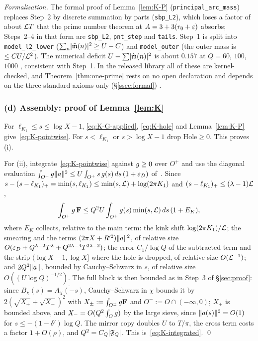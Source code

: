 \emph{Formalisation.} The formal proof of Lemma~\ref{lem:K-P} (\texttt{principal\_arc\_mass}) replaces Step~2 by discrete
summation by parts (\texttt{sbp\_L2}), which loses a factor of about $\mathcal L T$ that the prime number theorem at $A=3+3(r_0+\varepsilon)$ absorbs;
Steps~2--4 in that form are \texttt{sbp\_L2}, \texttt{pnt\_step} and \texttt{tails}. Step~1 is split into \texttt{model\_l2\_lower}
($\sum_n\lvert \tilde{\mathfrak m}(n)\rvert^2\ge U-C$) and \texttt{model\_outer} (the outer mass is $\le CU/\mathcal L^2$). The numerical deficit
$U-\sum\lvert \tilde{\mathfrak m}(n)\rvert^2$ is about $0.157$ at $Q=60$, $100$, $1000$ \tagN, consistent with Step~1. In the released library all of these
are kernel-checked, and Theorem~\ref{thm:one-prime} rests on no open declaration and depends on the three standard axioms only
(\S\ref{ssec:formal}) \tagL.

\subsubsection*{(d) Assembly: proof of Lemma~\ref{lem:K}}
For $\ell_{K_1}\le s\le\log X-1$, \eqref{eq:K-G-applied}, \eqref{eq:K-hole} and Lemma~\ref{lem:K-P} give~\eqref{eq:K-pointwise}. For $s<\ell_{K_1}$ or
$s>\log X-1$ drop $\mathrm{Hole}\ge0$. This proves (i).

For (ii), integrate~\eqref{eq:K-pointwise} against $g\ge0$ over $O^+$ and use the diagonal evaluation
$\int_{O^+}g\lVert a\rVert^2\le U\int_{O^+}s\,g(s)\,ds\,(1+\varepsilon_D)$ of~\cite{DSouza}. Since $s-(s-\ell_{K_1})_+=\min(s,\ell_{K_1})\le\min(s,\mathcal L)+\log(2\pi K_1)$
and $(s-\ell_{K_1})_+\le(\lambda-1)\mathcal L$,
\[
\int_{O^+}g\,\mathbf F\le Q^2U\int_{O^+}g(s)\min(s,\mathcal L)\,ds\,(1+E_K),
\]
where $E_K$ collects, relative to the main term: the kink shift $\log(2\pi K_1)/\mathcal L$; the smearing and the terms $(2\pi X+R'^2)\lVert a\rVert^2$,
of relative size $O(\varepsilon_D+Q^{\lambda-2}T^\lambda+Q^{2\lambda-4}T^{2\lambda-2})$; the error $C_1/\log Q$ of the subtracted term and the strip
$(\log X-1,\log X]$ where the hole is dropped, of relative size $O(\mathcal L^{-1})$; and $2Q^2\lVert a\rVert$, bounded by Cauchy--Schwarz in $s$, of relative
size $O((U\log Q)^{-1/2})$. The full block is then bounded as in Step~3 of \S\ref{sec:proof}: since $B_\chi(s)=\overline{A_\chi(-s)}$, Cauchy--Schwarz in $\chi$ bounds it by
$2(\sqrt{X_+}+\sqrt{X_-})^2$ with $X_\pm:=\int_{O^\pm}g\mathbf F$ and $O^-:=O\cap(-\infty,0)$; $X_+$ is bounded above, and $X_-=O(Q^2\int_Og)$ by the large sieve,
since $\lVert a(s)\rVert^2=O(1)$ for $s\le-(1-\delta')\log Q$. The mirror copy doubles $U$ to $T/\pi$, the cross term costs a factor $1+O(\rho)$, and $Q^2=C_Q\lvert \mathfrak F_Q\rvert$.
This is~\eqref{eq:K-integrated}. \qed

